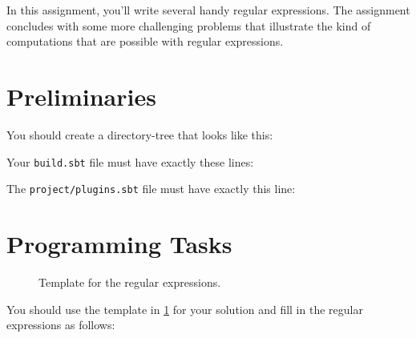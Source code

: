 
In this assignment, you'll write several handy regular expressions. The assignment concludes with some more challenging problems that illustrate the kind of computations that are possible with regular expressions.

\section{Preliminaries}

You should create a directory-tree that looks like this:


Your \texttt{build.sbt} file must have exactly these lines:


The \texttt{project/plugins.sbt} file must have exactly this line:


\section{Programming Tasks}

\begin{figure}
\caption{Template for the regular expressions.}
\label{regex_template}
\end{figure}

You should use the template in \cref{regex_template} for your solution and fill in the regular expressions as follows:

